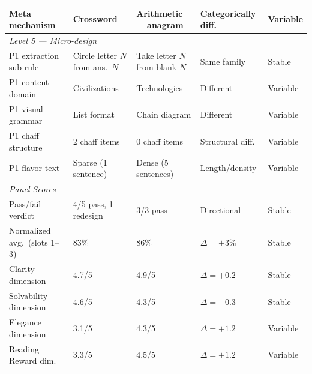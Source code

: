 \begin{table}[h]
\begin{tabular}{p{2.4cm}p{2.8cm}p{2.8cm}p{2.2cm}l}
Meta mechanism & Crossword & Arithmetic + anagram & Categorically diff. & Variable \\
\midrule
\multicolumn{5}{l}{\textit{Level 5 --- Micro-design}} \\
P1 extraction sub-rule & Circle letter $N$ from ans.\ $N$ & Take letter $N$ from blank $N$ & Same family & Stable \\
P1 content domain & Civilizations & Technologies & Different & Variable \\
P1 visual grammar & List format & Chain diagram & Different & Variable \\
P1 chaff structure & 2 chaff items & 0 chaff items & Structural diff. & Variable \\
P1 flavor text & Sparse (1 sentence) & Dense (5 sentences) & Length/density & Variable \\
\midrule
\multicolumn{5}{l}{\textit{Panel Scores}} \\
Pass/fail verdict & 4/5 pass, 1 redesign & 3/3 pass & Directional & Stable \\
Normalized avg.\ (slots 1--3) & 83\% & 86\% & $\Delta = +3\%$ & Stable \\
Clarity dimension & 4.7/5 & 4.9/5 & $\Delta = +0.2$ & Stable \\
Solvability dimension & 4.6/5 & 4.3/5 & $\Delta = -0.3$ & Stable \\
Elegance dimension & 3.1/5 & 4.3/5 & $\Delta = +1.2$ & Variable \\
Reading Reward dim. & 3.3/5 & 4.5/5 & $\Delta = +1.2$ & Variable \\
\bottomrule
\end{tabular}
\end{table}
